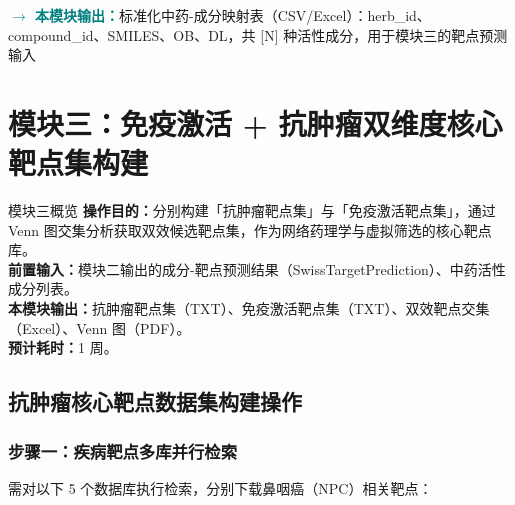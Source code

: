 \documentclass[12pt,a4paper,twoside]{article}
\newcommand{\moduleoutput}[1]{\par\vspace{6pt}\noindent\textcolor{teal}{\textbf{$\rightarrow$ 本模块输出：}}#1\vspace{6pt}}
\begin{document}
\moduleoutput{标准化中药-成分映射表（CSV/Excel）：herb\_id、compound\_id、SMILES、OB、DL，共 [N] 种活性成分，用于模块三的靶点预测输入}

\section{模块三：免疫激活 + 抗肿瘤双维度核心靶点集构建}
\label{sec:module3}

\begin{infobox}{模块三概览}
\textbf{操作目的：}分别构建「抗肿瘤靶点集」与「免疫激活靶点集」，通过 Venn 图交集分析获取双效候选靶点集，作为网络药理学与虚拟筛选的核心靶点库。\\
\textbf{前置输入：}模块二输出的成分-靶点预测结果（SwissTargetPrediction）、中药活性成分列表。\\
\textbf{本模块输出：}抗肿瘤靶点集（TXT）、免疫激活靶点集（TXT）、双效靶点交集（Excel）、Venn 图（PDF）。\\
\textbf{预计耗时：}1 周。
\end{infobox}

\subsection{抗肿瘤核心靶点数据集构建操作}
\label{sec:module3_tumor}

\subsubsection{步骤一：疾病靶点多库并行检索}

需对以下 5 个数据库执行检索，分别下载鼻咽癌（NPC）相关靶点：
\end{document}
